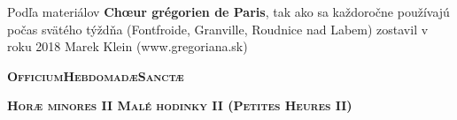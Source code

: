 
\def \feria {A}
\def \feriashort {b}
\def \ohschaptername {c}
\let\feriashort\relax
\let\feria\relax
\clearpage
{}
\begin{center}
Podľa materiálov \textbf{Chœur grégorien de Paris}, 
\linebreak tak ako sa každoročne používajú počas svätého týždňa
\linebreak (Fontfroide, Granville, Roudnice nad Labem)
\linebreak zostavil v roku 2018 Marek Klein (www.gregoriana.sk)
\end{center}
\thispagestyle{empty}
\clearpage
\begin{center}\huge{\textbf{\textsc{Officium\linebreak Hebdomadæ\linebreak Sanctæ}}}\end{center}

\begin{center}\large{\textbf{\textsc{
Horæ minores II\linebreak
Malé hodinky II\linebreak
(Petites Heures II)
}}}\end{center}
\thispagestyle{empty}
\newpage{}



